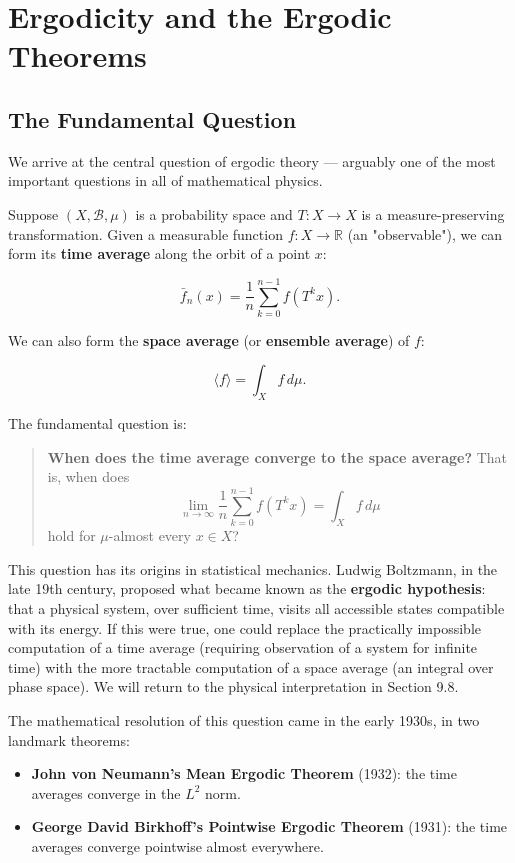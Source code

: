 \chapter{Ergodicity and the Ergodic Theorems}\label{ch:9}

\section{The Fundamental Question}\label{sec:9.1}

We arrive at the central question of ergodic theory --- arguably one of the most important questions in all of mathematical physics.

Suppose $(X, \mathcal{B}, \mu)$ is a probability space and $T: X \to X$ is a measure-preserving transformation. Given a measurable function $f: X \to \mathbb{R}$ (an "observable"), we can form its \textbf{time average} along the orbit of a point $x$:

\[
\bar{f}_n(x) = \frac{1}{n} \sum_{k=0}^{n-1} f(T^k x).
\]

We can also form the \textbf{space average} (or \textbf{ensemble average}) of $f$:

\[
\langle f \rangle = \int_X f \, d\mu.
\]

The fundamental question is:

\begin{quote}
\textbf{When does the time average converge to the space average?} That is, when does
\[
\lim_{n \to \infty} \frac{1}{n} \sum_{k=0}^{n-1} f(T^k x) = \int_X f \, d\mu
\]
hold for $\mu$-almost every $x \in X$?
\end{quote}

This question has its origins in statistical mechanics. Ludwig Boltzmann, in the late 19th century, proposed what became known as the \textbf{ergodic hypothesis}: that a physical system, over sufficient time, visits all accessible states compatible with its energy. If this were true, one could replace the practically impossible computation of a time average (requiring observation of a system for infinite time) with the more tractable computation of a space average (an integral over phase space). We will return to the physical interpretation in Section 9.8.

The mathematical resolution of this question came in the early 1930s, in two landmark theorems:

\begin{itemize}[nosep]
  \item \textbf{John von Neumann's Mean Ergodic Theorem} (1932): the time averages converge in the $L^2$ norm.
  \item \textbf{George David Birkhoff's Pointwise Ergodic Theorem} (1931): the time averages converge pointwise almost everywhere.
\end{itemize}

